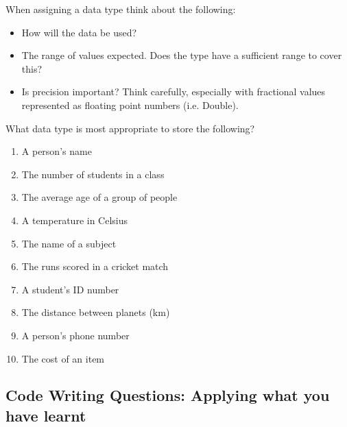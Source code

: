 \begin{enumerate}
When assigning a data type think about the following:
\begin{itemize}
  \item How will the data be used?
  \item The range of values expected. Does the type have a sufficient range to cover this?
  \item Is precision important? Think carefully, especially with fractional values represented as floating point numbers (i.e. Double).
\end{itemize}
  What data type is most appropriate to store the following?
  \begin{multicols}{2}
    \begin{enumerate}
      \item A person’s name
      \item The number of students in a class
      \item The average age of a group of people
      \item A temperature in Celsius
      \item The name of a subject
      \item The runs scored in a cricket match
      \item A student’s ID number
      \item The distance between planets (km)
      \item A person’s phone number
      \item The cost of an item
    \end{enumerate}
  \end{multicols}
\end{enumerate}

\clearpage
\subsection{Code Writing Questions: Applying what you have learnt} %
\label{sub:code_writing_questions_applying_what_you_have_learnt_data}

